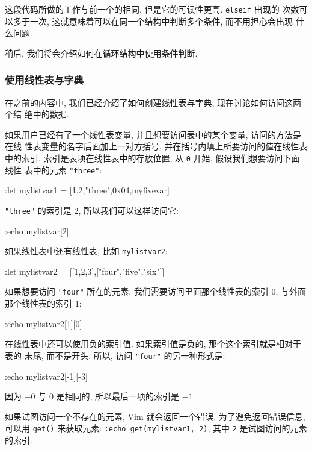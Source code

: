 这段代码所做的工作与前一个的相同, 但是它的可读性更高. \texttt{elseif} 出现的
次数可以多于一次, 这就意味着可以在同一个结构中判断多个条件, 而不用担心会出现
什么问题.

稍后, 我们将会介绍如何在循环结构中使用条件判断.

\subsubsection{使用线性表与字典}
\label{subsubsec:working_with_lists_and_dictionaries}

在之前的内容中, 我们已经介绍了如何创建线性表与字典, 现在讨论如何访问这两个结
绝中的数据.

如果用户已经有了一个线性表变量, 并且想要访问表中的某个变量, 访问的方法是在线
性表变量的名字后面加上一对方括号, 并在括号内填上所要访问的值在线性表中的索引.
索引是表项在线性表中的存放位置, 从 \texttt{0} 开始. 假设我们想要访问下面线性
表中的元素 \texttt{"three"}:
\begin{vimcode}
:let mylistvar1 = [1,2,"three",0x04,myfivevar]
\end{vimcode}
\texttt{"three"} 的索引是 2, 所以我们可以这样访问它:
\begin{vimcode}
:echo mylistvar[2]
\end{vimcode}
如果线性表中还有线性表, 比如 \texttt{mylistvar2}:
\begin{vimcode}
:let mylistvar2 = [[1,2,3],["four","five","six"]]
\end{vimcode}
如果想要访问 \texttt{"four"} 所在的元素, 我们需要访问里面那个线性表的索引 0,
与外面那个线性表的索引 1:
\begin{vimcode}
:echo mylistvar2[1][0]
\end{vimcode}

在线性表中还可以使用负的索引值. 如果索引值是负的, 那个这个索引就是相对于表的
末尾, 而不是开头. 所以, 访问 \texttt{"four"} 的另一种形式是:
\begin{vimcode}
:echo mylistvar2[-1][-3]
\end{vimcode}
因为 $-0$ 与 $0$ 是相同的, 所以最后一项的索引是 $-1$.

\begin{warning}
    如果试图访问一个不存在的元素, Vim 就会返回一个错误. 为了避免返回错误信息,
    可以用 \texttt{get()} 来获取元素: \texttt{:echo get(mylistvar1, 2)}, 其中
    \texttt{2} 是试图访问的元素的索引.
\end{warning}

